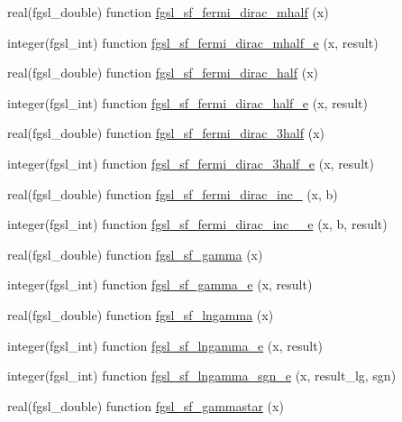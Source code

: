 \begin{DoxyCompactItemize}
\item 
real(fgsl\+\_\+double) function \hyperlink{specfunc_8finc_a49deb5984fe9f1d840ce7d11adbbadd9}{fgsl\+\_\+sf\+\_\+fermi\+\_\+dirac\+\_\+mhalf} (x)
\item 
integer(fgsl\+\_\+int) function \hyperlink{specfunc_8finc_a47006f83ac0109642ee9e09e8009316f}{fgsl\+\_\+sf\+\_\+fermi\+\_\+dirac\+\_\+mhalf\+\_\+e} (x, result)
\item 
real(fgsl\+\_\+double) function \hyperlink{specfunc_8finc_a43a9df047893e2cdf5b08ce4d949d2d4}{fgsl\+\_\+sf\+\_\+fermi\+\_\+dirac\+\_\+half} (x)
\item 
integer(fgsl\+\_\+int) function \hyperlink{specfunc_8finc_acbc03700253fa611c06df89599db49e0}{fgsl\+\_\+sf\+\_\+fermi\+\_\+dirac\+\_\+half\+\_\+e} (x, result)
\item 
real(fgsl\+\_\+double) function \hyperlink{specfunc_8finc_a7895eca050c928050b368d6420db34c5}{fgsl\+\_\+sf\+\_\+fermi\+\_\+dirac\+\_\+3half} (x)
\item 
integer(fgsl\+\_\+int) function \hyperlink{specfunc_8finc_aa53efeb5a773eee83b61e14b1e8bff60}{fgsl\+\_\+sf\+\_\+fermi\+\_\+dirac\+\_\+3half\+\_\+e} (x, result)
\item 
real(fgsl\+\_\+double) function \hyperlink{specfunc_8finc_a7196ccb37de9c0cee74474a21229edc3}{fgsl\+\_\+sf\+\_\+fermi\+\_\+dirac\+\_\+inc\+\_} (x, b)
\item 
integer(fgsl\+\_\+int) function \hyperlink{specfunc_8finc_a6022a04398679d3d36fba8f20bec29d5}{fgsl\+\_\+sf\+\_\+fermi\+\_\+dirac\+\_\+inc\+\_\+\_\+e} (x, b, result)
\item 
real(fgsl\+\_\+double) function \hyperlink{specfunc_8finc_a22d0896ae7f07082ec311981ca10c06a}{fgsl\+\_\+sf\+\_\+gamma} (x)
\item 
integer(fgsl\+\_\+int) function \hyperlink{specfunc_8finc_adbcecf1033cdc899b05e34fddb52574d}{fgsl\+\_\+sf\+\_\+gamma\+\_\+e} (x, result)
\item 
real(fgsl\+\_\+double) function \hyperlink{specfunc_8finc_a3366e0498820e05faceffd9b4e5ef96a}{fgsl\+\_\+sf\+\_\+lngamma} (x)
\item 
integer(fgsl\+\_\+int) function \hyperlink{specfunc_8finc_a6da8dad547399e50f65840de68047ade}{fgsl\+\_\+sf\+\_\+lngamma\+\_\+e} (x, result)
\item 
integer(fgsl\+\_\+int) function \hyperlink{specfunc_8finc_a73d2e8584445eb1d4bbd2306091e92f4}{fgsl\+\_\+sf\+\_\+lngamma\+\_\+sgn\+\_\+e} (x, result\+\_\+lg, sgn)
\item 
real(fgsl\+\_\+double) function \hyperlink{specfunc_8finc_ae531dae295cc1cdeb68df23e1fce4a25}{fgsl\+\_\+sf\+\_\+gammastar} (x)

\end{DoxyCompactItemize}
